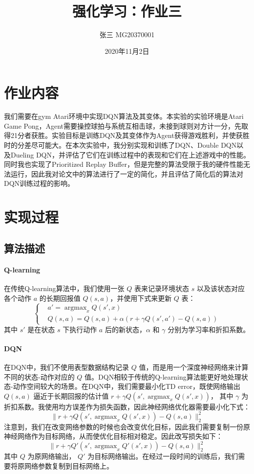\documentclass[a4paper,12pt]{article}
\begin{document}
\begin{CJK}{UTF8}{gbsn}

\title{强化学习：作业三}

\author{张三 MG20370001}

\date{2020年11月2日}

\maketitle

\section{作业内容}
我们需要在gym Atari环境中实现DQN算法及其变体。本实验的实验环境是Atari Game Pong，Agent需要操控球拍与系统互相击球，未接到球则对方计一分，先取得21分者获胜。实验目标是训练DQN及其变体作为Agent获得游戏胜利，并使获胜时的分差尽可能大。在本次实验中，我分别实现和训练了DQN\cite{ref1}、Double DQN\cite{ref2}以及Dueling DQN\cite{ref3}，并评估了它们在训练过程中的表现和它们在上述游戏中的性能。同时我也实现了Prioritized Replay Buffer\cite{ref4}，但是完整的算法受限于我的硬件性能无法运行，因此我对论文中的算法进行了一定的简化，并且评估了简化后的算法对DQN训练过程的影响。

\section{实现过程}
\subsection{算法描述}
\paragraph{Q-learning\cite{ref5}} 在传统Q-learning算法中，我们使用一张 $Q$ 表来记录环境状态 $s$ 以及该状态对应各个动作 $a$ 的长期回报值 $Q(s,a)$，并使用下式来更新 $Q$ 表：
$$
\begin{cases}
	&a'= \mathop{\arg\max}_{x} Q(s',x)\\
	&Q(s,a)=Q(s,a)+\alpha(r+\gamma Q(s',a')-Q(s,a)) 
\end{cases}
$$
其中 $s'$ 是在状态 $s$ 下执行动作 $a$ 后的新状态，$\alpha$ 和 $\gamma$ 分别为学习率和折扣系数。
\paragraph{DQN} 在DQN中，我们不使用表型数据结构记录 $Q$ 值，而是用一个深度神经网络来计算不同的状态-动作对应的 $Q$ 值。DQN相较于传统的Q-learning算法能更好地处理状态-动作空间较大的场景。在DQN中，我们需要最小化TD error，既使网络输出 $Q(s,a)$ 逼近于长期回报的估计值 $r+\gamma Q(s',\mathop{\arg\max}_{x} Q(s',x))$， 其中 $\gamma$ 为折扣系数。我使用均方误差作为损失函数，因此神经网络优化器需要最小化下式：
$$
\|r+\gamma Q(s',\mathop{\arg\max}_{x} Q(s',x))-Q(s,a)\|_2^2
$$
注意到，我们在改变网络参数的时候也会改变优化目标，因此我们需要复制一份原神经网络作为目标网络，从而使优化目标相对稳定。因此改写损失如下：
$$
\|r+\gamma Q'(s',\mathop{\arg\max}_{x} Q'(s',x))-Q(s,a)\|_2^2
$$
其中 $Q$ 为原网络输出， $Q'$ 为目标网络输出。在经过一段时间的训练后，我们需要将原网络参数复制到目标网络上。

\end{CJK}
\end{document}
